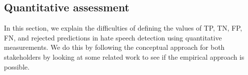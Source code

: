 


\subsection{Quantitative assessment}
\label{sec:quantitative-assessment}
%
%
%
%
%
%
%
%
%
%
%
%

In this section, we explain the difficulties of defining the values of TP, TN, FP, FN, and rejected predictions in hate speech detection using quantitative measurements.
%
We do this by following the conceptual approach for both stakeholders by looking at some related work to see if the empirical approach is possible.
%

